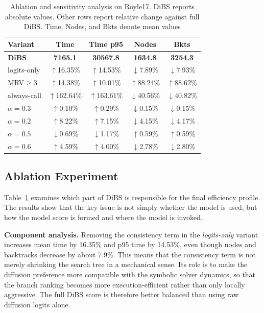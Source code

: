 \documentclass[lettersize,journal]{IEEEtran}
\newcommand{\good}[1]{{\color{green!50!black}$\downarrow$#1}}
\newcommand{\bad}[1]{{\color{red!70!black}$\uparrow$#1}}
\begin{document}
\begin{table}[h]
\centering
\caption{Ablation and sensitivity analysis on Royle17. DiBS reports absolute values. Other rows report relative change against full DiBS. Time, Nodes, and Bkts denote mean values}
\label{tab:ablation}
\small
\setlength{\tabcolsep}{4.0pt}
\renewcommand{\arraystretch}{1.08}
\begin{tabular}{lcccc}
\toprule
\textbf{Variant} & \textbf{Time} & \textbf{Time p95} & \textbf{Nodes} & \textbf{Bkts} \\
\midrule
\textbf{DiBS}
& \textbf{7165.1}
& \textbf{30567.8}
& \textbf{1634.8}
& \textbf{3254.3} \\
logits-only
& \bad{16.35\%}
& \bad{14.53\%}
& \good{7.89\%}
& \good{7.93\%} \\
MRV$\geq$3
& \bad{14.38\%}
& \bad{10.01\%}
& \bad{88.24\%}
& \bad{88.62\%} \\
always-call
& \bad{162.64\%}
& \bad{163.61\%}
& \good{40.56\%}
& \good{40.82\%} \\
\midrule
$\alpha=0.3$
& \bad{0.10\%}
& \bad{0.29\%}
& \good{0.15\%}
& \good{0.15\%} \\
$\alpha=0.2$
& \bad{8.22\%}
& \bad{7.15\%}
& \good{4.15\%}
& \good{4.17\%} \\
$\alpha=0.5$
& \good{0.69\%}
& \good{1.17\%}
& \bad{0.59\%}
& \bad{0.59\%} \\
$\alpha=0.6$
& \bad{4.59\%}
& \bad{4.00\%}
& \good{2.78\%}
& \good{2.80\%} \\
\bottomrule
\end{tabular}
\end{table}

\subsection{Ablation Experiment}
Table~\ref{tab:ablation} examines which part of DiBS is responsible for the final efficiency profile.
The results show that the key issue is not simply whether the model is used, but how the model score is formed and where the model is invoked.

\textbf{Component analysis.} Removing the consistency term in the \textit{logits-only} variant increases mean time by 16.35\% and p95 time by 14.53\%, even though nodes and backtracks decrease by about 7.9\%.
This means that the consistency term is not merely shrinking the search tree in a mechanical sense.
Its role is to make the diffusion preference more compatible with the symbolic solver dynamics, so that the branch ranking becomes more execution-efficient rather than only locally aggressive.
The full DiBS score is therefore better balanced than using raw diffusion logits alone.
\end{document}
